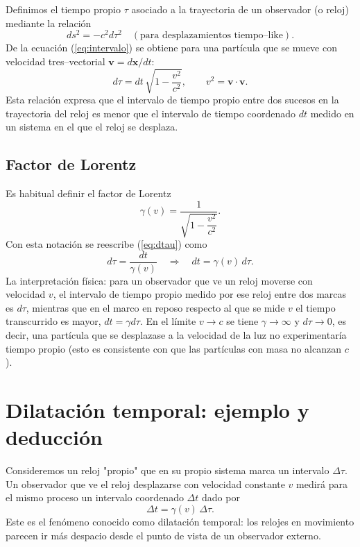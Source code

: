 \documentclass[12pt,oneside]{book}
\begin{document}
Definimos el tiempo propio $\tau$ asociado a la trayectoria de un observador (o reloj) mediante la relación
\begin{equation}\label{eq:proper_time_def}
  ds^2 = -c^2 d\tau^2\quad(\text{para desplazamientos tiempo--like}).
\end{equation}
De la ecuación (\ref{eq:intervalo}) se obtiene para una partícula que se mueve con velocidad tres--vectorial $\mathbf{v}=d\mathbf{x}/dt$:
\begin{equation}\label{eq:dtau}
  d\tau = dt\,\sqrt{1-\dfrac{v^2}{c^2}},\qquad v^2=\mathbf{v}\cdot\mathbf{v}.
\end{equation}
Esta relación expresa que el intervalo de tiempo propio entre dos sucesos en la trayectoria del reloj es menor que el intervalo de tiempo coordenado $dt$ medido en un sistema en el que el reloj se desplaza.

\section{Factor de Lorentz}
Es habitual definir el factor de Lorentz
\begin{equation}
  \gamma(v) = \frac{1}{\sqrt{1-\dfrac{v^2}{c^2}}}.
\end{equation}
Con esta notación se reescribe (\ref{eq:dtau}) como
\begin{equation}
  d\tau = \frac{dt}{\gamma(v)}\quad\Longrightarrow\quad dt = \gamma(v)\, d\tau.
\end{equation}
La interpretación física: para un observador que ve un reloj moverse con velocidad $v$, el intervalo de tiempo propio medido por ese reloj entre dos marcas es $d\tau$, mientras que en el marco en reposo respecto al que se mide $v$ el tiempo transcurrido es mayor, $dt=\gamma d\tau$. En el límite $v\to c$ se tiene $\gamma\to\infty$ y $d\tau\to 0$, es decir, una partícula que se desplazase a la velocidad de la luz no experimentaría tiempo propio (esto es consistente con que las partículas con masa no alcanzan $c$).

\chapter{Dilatación temporal: ejemplo y deducción}
Consideremos un reloj "propio" que en su propio sistema marca un intervalo $\Delta\tau$. Un observador que ve el reloj desplazarse con velocidad constante $v$ medirá para el mismo proceso un intervalo coordenado $\Delta t$ dado por
\begin{equation}\label{eq:time_dilation}
  \Delta t = \gamma(v)\, \Delta\tau.
\end{equation}
Este es el fenómeno conocido como dilatación temporal: los relojes en movimiento parecen ir más despacio desde el punto de vista de un observador externo.
\end{document}
